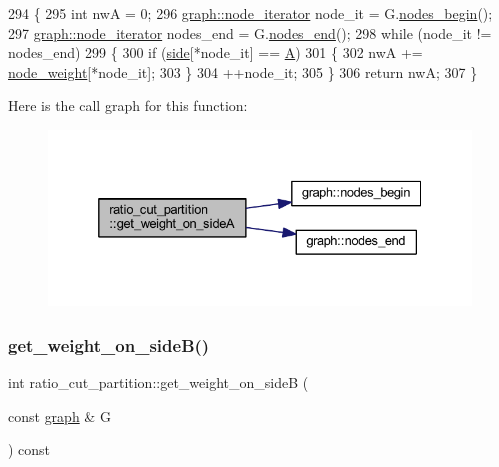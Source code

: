 \begin{DoxyCode}
294 \{
295     \textcolor{keywordtype}{int} nwA = 0;
296     \mbox{\hyperlink{classgraph_a2cb374b84c133ce13f94e73c3e5da7fa}{graph::node\_iterator}} node\_it = G.\mbox{\hyperlink{classgraph_aec053a4b509d1be804237a80044c54c0}{nodes\_begin}}();
297     \mbox{\hyperlink{classgraph_a2cb374b84c133ce13f94e73c3e5da7fa}{graph::node\_iterator}} nodes\_end = G.\mbox{\hyperlink{classgraph_abbf9c0cb5629e98e1142254911238173}{nodes\_end}}();
298     \textcolor{keywordflow}{while} (node\_it != nodes\_end)
299     \{
300     \textcolor{keywordflow}{if} (\mbox{\hyperlink{classratio__cut__partition_a2bf913d1d8607747885177a3b585e611}{side}}[*node\_it] == \mbox{\hyperlink{classratio__cut__partition_a9c0da5ad845b01bddbc1f238fa35cdd0}{A}})
301     \{
302         nwA += \mbox{\hyperlink{classratio__cut__partition_a4d9d2a9317a062f839ea7155c37b173f}{node\_weight}}[*node\_it];
303     \}
304     ++node\_it;
305     \}
306     \textcolor{keywordflow}{return} nwA;
307 \}
\end{DoxyCode}
Here is the call graph for this function\+:\nopagebreak
\begin{figure}[H]
\begin{center}
\leavevmode
\includegraphics[width=332pt]{classratio__cut__partition_af68528cd0b199718e6b2f5fe8182e779_cgraph}
\end{center}
\end{figure}
\mbox{\label{classratio__cut__partition_abd0835eeaec80f5ba56de5428985259f}} 
\subsubsection{\texorpdfstring{get\+\_\+weight\+\_\+on\+\_\+side\+B()}{get\_weight\_on\_sideB()}}
{\footnotesize\ttfamily int ratio\+\_\+cut\+\_\+partition\+::get\+\_\+weight\+\_\+on\+\_\+sideB (\begin{DoxyParamCaption}\item[{const \mbox{\hyperlink{classgraph}{graph}} \&}]{G }\end{DoxyParamCaption}) const}

